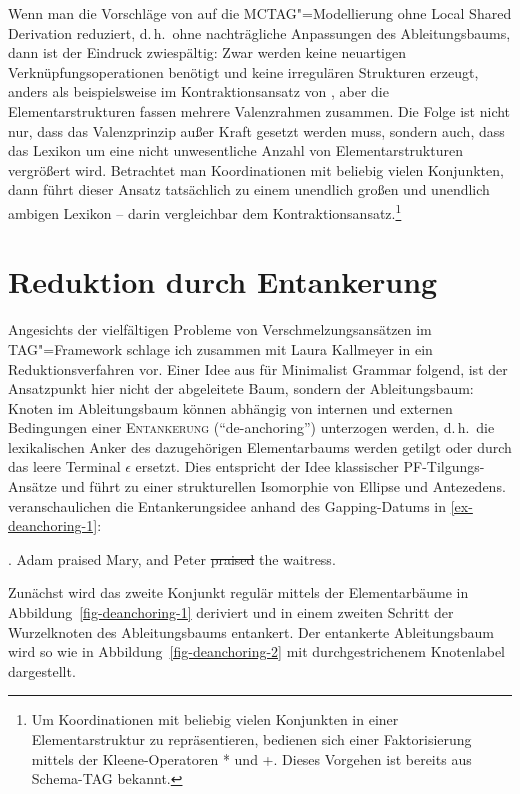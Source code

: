 Wenn man die Vorschläge von \cite{Seddah:etal:10} auf die MCTAG"=Modellierung ohne Local Shared Derivation reduziert, d.\,h.\ ohne nachträgliche Anpassungen des Ableitungsbaums, dann ist der Eindruck zwiespältig: Zwar werden keine neuartigen Verknüpfungsoperationen benötigt und keine irregulären Strukturen erzeugt, anders als beispielsweise im Kontraktionsansatz von \cite{Sarkar:Joshi:97}, aber die Elementarstrukturen fassen mehrere Valenzrahmen zusammen. Die Folge  ist nicht nur, dass das Valenzprinzip au\ss er Kraft gesetzt werden muss, sondern auch, dass das Lexikon um eine nicht unwesentliche Anzahl von Elementarstrukturen vergrö\ss ert wird. Betrachtet man Koordinationen mit beliebig vielen Konjunkten, dann führt dieser Ansatz tatsächlich zu einem unendlich gro\ss en und unendlich ambigen Lexikon -- darin vergleichbar dem Kontraktionsansatz.\footnote{Um Koordinationen mit beliebig vielen Konjunkten in einer Elementarstruktur zu repräsentieren, bedienen sich \cite{Seddah:etal:10} einer Faktorisierung mittels der Kleene-Operatoren * und +. Dieses Vorgehen ist bereits aus Schema-TAG \citep{Harbusch:00b} bekannt.}    



\section{Reduktion durch Entankerung} \label{sec-deanchoring}

Angesichts der vielfältigen Probleme von Verschmelzungsansätzen im TAG"=Framework schlage ich zusammen mit Laura Kallmeyer in \cite{Lichte:Kallmeyer:10} ein Reduktionsverfahren vor. Einer Idee aus \cite{Kobele:09} für Minimalist Grammar folgend, ist der Ansatzpunkt hier nicht der abgeleitete Baum, sondern der Ableitungsbaum: Knoten im Ableitungsbaum können abhängig von internen und externen Bedingungen einer \textsc{Entankerung} ("`de-anchoring"') unterzogen werden, d.\,h.\ die lexikalischen Anker des dazugehörigen Elementarbaums werden getilgt oder durch das leere Terminal $\epsilon$ ersetzt. Dies entspricht der Idee klassischer PF-Tilgungs-Ansätze und führt zu einer strukturellen Isomorphie von Ellipse und Antezedens.  \cite{Lichte:Kallmeyer:10} veranschaulichen die Ent\-anker\-ungs\-idee anhand des Gapping-Datums in \ref{ex-deanchoring-1}: 

\ex. \label{ex-deanchoring-1} Adam praised Mary, and Peter \sout{praised} the waitress.   
  
Zunächst wird das zweite Konjunkt regulär mittels der Elementarbäume in Abbildung~\ref{fig-deanchoring-1} deriviert und in einem zweiten Schritt der Wurzelknoten des Ableitungsbaums entankert. Der entankerte Ableitungsbaum wird so wie in Abbildung~\ref{fig-deanchoring-2} mit durchgestrichenem Knotenlabel dargestellt. 

